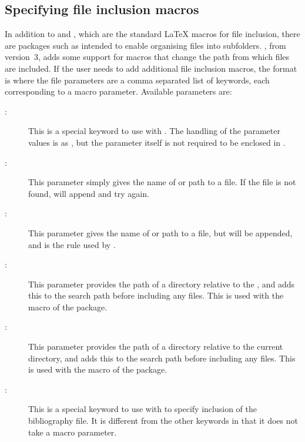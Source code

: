 \documentclass{article}
\begin{document}
\subsection{Specifying file inclusion macros}

In addition to  and , which are the standard \LaTeX{} macros for file inclusion, there are packages such as  intended to enable organising files into subfolders. \TeXcount{}, from version~3, adds some support for macros that change the path from which files are included. If the user needs to add additional file inclusion macros, the format is
where the file parameters are a comma separated list of keywords, each corresponding to a macro parameter. Available parameters are:
%
\begin{description}

\item[:] This is a special keyword to use with . The handling of the parameter values is as , but the parameter itself is not required to be enclosed in \code{\{\}}.

\item[:] This parameter simply gives the name of or path to a file. If the file is not found, \TeXcount{} will append  and try again.

\item[:] This parameter gives the name of or path to a file, but  will be appended, and is the rule used by .

\item[:] This parameter provides the path of a directory relative to the , and adds this to the search path before including any files. This is used with the  macro of the  package.

\item[:] This parameter provides the path of a directory relative to the current directory, and adds this to the search path before including any files. This is used with the  macro of the  package.

\item[:] This is a special keyword to use with  to specify inclusion of the bibliography file. It is different from the other keywords in that it does not take a macro parameter.

\end{description}
\end{document}
